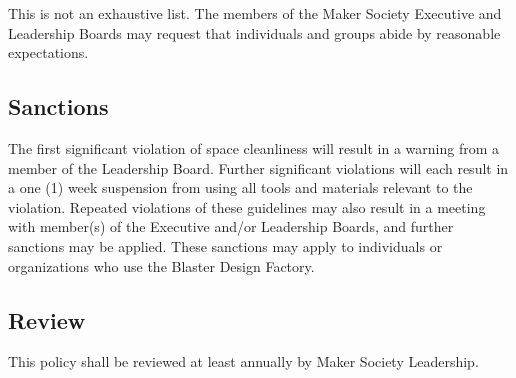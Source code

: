 \documentclass[12pt,letterpaper]{article}
\begin{document}
This is not an exhaustive list. The members of the Maker Society Executive and Leadership Boards may request that individuals and groups abide by reasonable expectations.


\subsection{Sanctions}

The first significant violation of space cleanliness will result in a warning from a member of the Leadership Board. Further significant violations will each result in a one (1) week suspension from using all tools and materials relevant to the violation. Repeated violations of these guidelines may also result in a meeting with member(s) of the Executive and/or Leadership Boards, and further sanctions may be applied. These sanctions may apply to individuals or organizations who use the Blaster Design Factory.

\subsection{Review}

This policy shall be reviewed at least annually by Maker Society Leadership.








    
\end{document}
